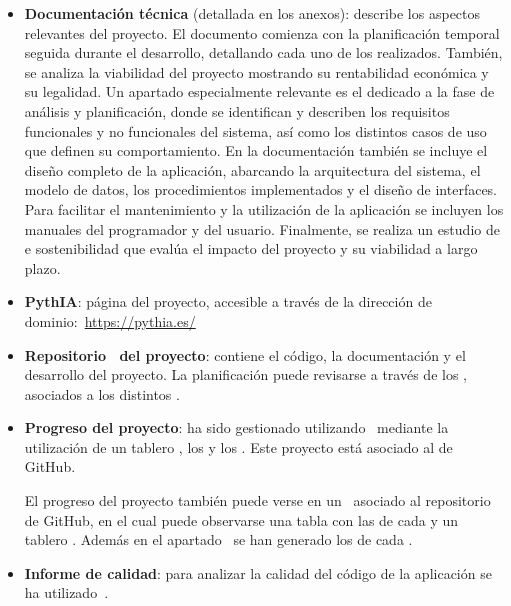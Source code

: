 \begin{itemize}
\tightlist
	\item \textbf{Documentación técnica} (detallada en los anexos): describe los aspectos relevantes del proyecto. El documento comienza con la planificación temporal seguida durante el desarrollo, detallando cada uno de los  realizados. También, se analiza la viabilidad del proyecto mostrando su rentabilidad económica y su legalidad. Un apartado especialmente relevante es el dedicado a la fase de análisis y planificación, donde se identifican y describen los requisitos funcionales y no funcionales del sistema, así como los distintos casos de uso que definen su comportamiento. En la documentación también se incluye el diseño completo de la aplicación, abarcando la arquitectura del sistema, el modelo de datos, los procedimientos implementados y el diseño de interfaces. Para facilitar el mantenimiento y la utilización de la aplicación se incluyen los manuales del programador y del usuario. Finalmente, se realiza un estudio de e sostenibilidad que evalúa el impacto del proyecto y su viabilidad a largo plazo.
	\item \textbf{PythIA}: página  del proyecto, accesible a través de la dirección de dominio:~\url{https://pythia.es/}
	\item \textbf{Repositorio~ del proyecto}: contiene el código, la documentación y el desarrollo del proyecto. La planificación puede revisarse a través de los , asociados a los distintos .
		\item \textbf{Progreso del proyecto}: ha sido gestionado utilizando~ mediante la utilización de un tablero , los  y los . Este proyecto está asociado al de GitHub.
		
		El progreso del proyecto también puede verse en un~ asociado al repositorio de GitHub, en el cual puede observarse una tabla con las  de cada  y un tablero . Además en el apartado~ se han generado los  de cada .
		\item \textbf{Informe de calidad}: para analizar la calidad del código de la aplicación se ha utilizado~.
\end{itemize}